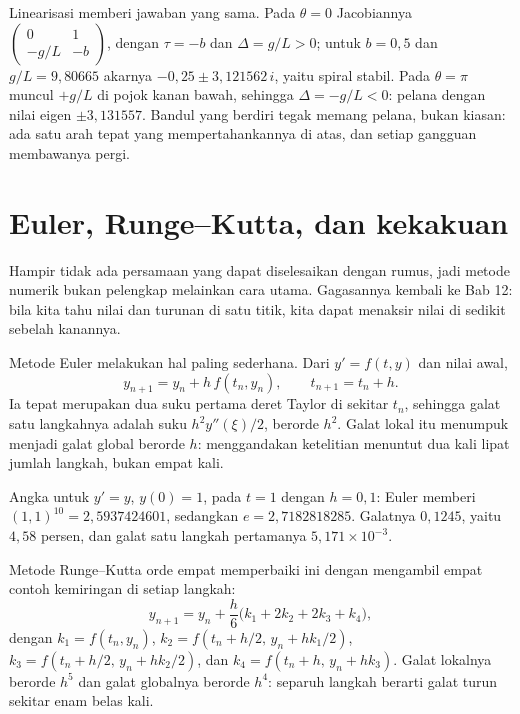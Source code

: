 Linearisasi memberi jawaban yang sama. Pada $\theta=0$ Jacobiannya
$\begin{pmatrix}0&1\\-g/L&-b\end{pmatrix}$, dengan $\tau=-b$ dan
$\Delta=g/L>0$; untuk $b=0{,}5$ dan $g/L=9{,}80665$ akarnya $-0{,}25\pm3{,}121562\,i$,
yaitu spiral stabil. Pada $\theta=\pi$ muncul $+g/L$ di pojok kanan bawah,
sehingga $\Delta=-g/L<0$: pelana dengan nilai eigen $\pm3{,}131557$. Bandul yang
berdiri tegak memang pelana, bukan kiasan: ada satu arah tepat yang
mempertahankannya di atas, dan setiap gangguan membawanya pergi.



\section{Euler, Runge--Kutta, dan kekakuan}

Hampir tidak ada persamaan yang dapat diselesaikan dengan rumus, jadi metode
numerik bukan pelengkap melainkan cara utama. Gagasannya kembali ke Bab 12: bila
kita tahu nilai dan turunan di satu titik, kita dapat menaksir nilai di sedikit
sebelah kanannya.

Metode Euler melakukan hal paling sederhana. Dari $y'=f(t,y)$ dan nilai awal,
\[
y_{n+1}=y_{n}+h\,f(t_{n},y_{n}),\qquad t_{n+1}=t_{n}+h .
\]
Ia tepat merupakan dua suku pertama deret Taylor di sekitar $t_{n}$, sehingga
galat satu langkahnya adalah suku $h^{2}y''(\xi)/2$, berorde $h^{2}$. Galat
lokal itu menumpuk menjadi galat global berorde $h$: menggandakan ketelitian
menuntut dua kali lipat jumlah langkah, bukan empat kali.

Angka untuk $y'=y$, $y(0)=1$, pada $t=1$ dengan $h=0{,}1$: Euler memberi
$(1{,}1)^{10}=2{,}5937424601$, sedangkan $e=2{,}7182818285$. Galatnya $0{,}1245$, yaitu
$4{,}58$ persen, dan galat satu langkah pertamanya $5{,}171\times10^{-3}$.

Metode Runge--Kutta orde empat memperbaiki ini dengan mengambil empat contoh
kemiringan di setiap langkah:
\[
y_{n+1}=y_{n}+\frac{h}{6}\bigl(k_{1}+2k_{2}+2k_{3}+k_{4}\bigr),
\]
dengan $k_{1}=f(t_{n},y_{n})$, $k_{2}=f(t_{n}+h/2,\,y_{n}+hk_{1}/2)$,
$k_{3}=f(t_{n}+h/2,\,y_{n}+hk_{2}/2)$, dan $k_{4}=f(t_{n}+h,\,y_{n}+hk_{3})$.
Galat lokalnya berorde $h^{5}$ dan galat globalnya berorde $h^{4}$: separuh
langkah berarti galat turun sekitar enam belas kali.

